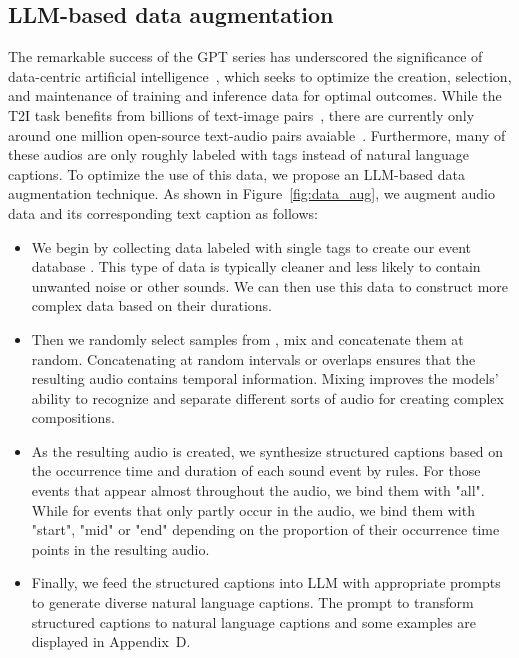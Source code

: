\documentclass{article}
\begin{document}
\subsection{LLM-based data augmentation}
\label{LLMDA}
The remarkable success of the GPT series has underscored the significance of data-centric artificial intelligence~\cite{zha2023data,jakubik2022data}, which seeks to optimize the creation, selection, and maintenance of training and inference data for optimal outcomes. While the T2I task benefits from billions of text-image pairs~\cite{schuhmann2022laion5b}, there are currently only around one million open-source text-audio pairs avaiable~\cite{huang2023makeanaudio}. Furthermore, many of these audios are only roughly labeled with tags instead of natural language captions. To optimize the use of this data, we propose an LLM-based data augmentation technique. As shown in Figure~\ref{fig:data_aug}, we augment audio data and its corresponding text caption as follows:
\begin{itemize}[leftmargin=*]
\item We begin by collecting data labeled with single tags to create our event database . This type of data is typically cleaner and less likely to contain unwanted noise or other sounds. We can then use this data to construct more complex data based on their durations.
\item Then we randomly select  samples from , mix and concatenate them at random. Concatenating at random intervals or overlaps ensures that the resulting audio contains temporal information. Mixing improves the models' ability to recognize and separate different sorts of audio for creating complex compositions. 
\item As the resulting audio is created, we synthesize structured captions based on the occurrence time and duration of each sound event by rules. For those events that appear almost throughout the audio, we bind them with "all". While for events that only partly occur in the audio, we bind them with "start", "mid" or "end" depending on the proportion of their occurrence time points in the resulting audio. 
\item Finally, we feed the structured captions into LLM with appropriate prompts to generate diverse natural language captions. The prompt to transform structured captions to natural language captions and some examples are displayed in Appendix~D.
\end{itemize}
\end{document}
